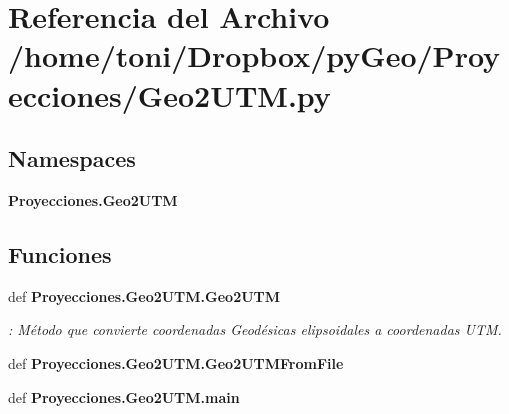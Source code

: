 \section{Referencia del Archivo /home/toni/\-Dropbox/py\-Geo/\-Proyecciones/\-Geo2\-U\-T\-M.py}
\label{Proyecciones_2Geo2UTM_8py}
\subsection*{Namespaces}
\begin{DoxyCompactItemize}
\item 
{\bf Proyecciones.\-Geo2\-U\-T\-M}
\end{DoxyCompactItemize}
\subsection*{Funciones}
\begin{DoxyCompactItemize}
\item 
def {\bf Proyecciones.\-Geo2\-U\-T\-M.\-Geo2\-U\-T\-M}
\begin{DoxyCompactList}\small\item\em \-: Método que convierte coordenadas Geodésicas elipsoidales a coordenadas U\-T\-M. \end{DoxyCompactList}\item 
def {\bf Proyecciones.\-Geo2\-U\-T\-M.\-Geo2\-U\-T\-M\-From\-File}
\item 
def {\bf Proyecciones.\-Geo2\-U\-T\-M.\-main}
\end{DoxyCompactItemize}
